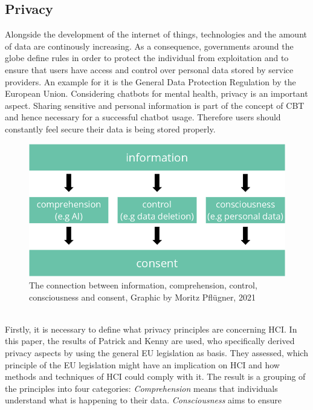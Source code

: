 \documentclass[sigconf, nonacm]{acmart}
\begin{document}
\subsection{Privacy}
\label{sec:three_one}
Alongside the development of the internet of things, technologies and the amount of data are continously increasing\cite{Reinsel2018}.
As a consequence, governments around the globe define rules in order to protect the individual from exploitation and to ensure that users have access and control over personal data stored by service providers.
An example for it is the General Data Protection Regulation by the European Union. Considering chatbots for mental health, privacy is an important aspect. Sharing sensitive and personal information is part of the concept of CBT and hence necessary for a successful chatbot usage. Therefore users should constantly feel secure their data is being stored properly. 
\begin{figure}[h]
  \centering
  \includegraphics[width=\linewidth]{privacy_base}
  \caption{The connection between information, comprehension, control, consciousness and consent, Graphic by Moritz Pflügner, 2021}
  \label{fig:privacy_base}
\end{figure}
\\
Firstly, it is necessary to define what privacy principles are concerning HCI. In this paper, the results of Patrick and Kenny \cite{Patrick2003} are used, who specifically derived privacy aspects by using the general EU legislation as basis.
They assessed, which principle of the EU legislation might have an implication on HCI and how methods and techniques of HCI could comply with it. The result is a grouping of the principles into four categories: \emph{Comprehension} means that individuals understand what is happening to their data. \emph{Consciousness} aims to ensure
\end{document}
